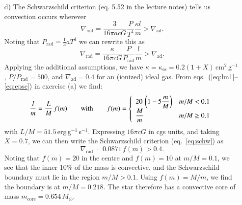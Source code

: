 \documentclass[a4paper,11pt]{article}
\newcommand{\Msun}{\ensuremath{{M}_\odot}}
\begin{document}
\begin{itemize}
\item[d)] The Schwarzschild criterion (eq. 5.52 in the lecture notes) tells us convection occurs wherever
\[
\nabla_\mathrm{rad} = \frac{3}{16\pi acG} \frac{P}{T^4} \frac{\kappa l}{m} > 
\nabla_\mathrm{ad}.
\]
Noting that $P_\mathrm{rad} = \frac{1}{3}aT^4$ we can rewrite this as
\begin{equation} \label{eq:schw}
\nabla_\mathrm{rad} = \frac{\kappa}{16\pi cG} \frac{P}{P_\mathrm{rad}} \frac{l}{m} >  \nabla_\mathrm{ad}.
\end{equation}
Applying the additional  assumptions, we have $\kappa = \kappa_\mathrm{es} = 0.2(1+X)$\,cm$^{2}$\,g$^{-1}$, $P/P_\mathrm{rad} = 500$, and $\nabla_\mathrm{ad} = 0.4$ for an (ionized) ideal gas. From eqs.~(\ref{eq:lm1}--\ref{eq:epsc}) in exercise (a) we find:
\begin{equation} \label{eq:loverm}
\frac{l}{m} = \frac{L}{M}\,f(m) \qquad \mathrm{with} \qquad f(m) = \left\{ 
\begin{array}{l@{\quad}l}
\displaystyle 20\,\left(1 - 5\frac{m}{M}\right) & m/M < 0.1 \\
\displaystyle \frac{M}{m} & m/M \geq 0.1 \\
\end{array} \right.
\end{equation}
with $L/M = 51.5$\,erg\,g$^{-1}$\,s$^{-1}$. Expressing $16\pi cG$ in cgs units, and taking $X=0.7$, we can then write the Schwarzschild criterion (eq.~\ref{eq:schw}) as
\[ \nabla_\mathrm{rad} = 0.0871\,f(m) > 0.4. \]
Noting that $f(m) = 20$ in the centre and $f(m) = 10$ at $m/M = 0.1$, we see that the inner 10\% of the mass is convective, and the Schwarzschild boundary must lie in the region $m/M > 0.1$. Using $f(m) = M/m$, we find the boundary is at $m/M = 0.218$. The star therefore has a convective core of mass $m_\mathrm{core} = 0.654\,\Msun$.

\end{itemize}
\end{document}

